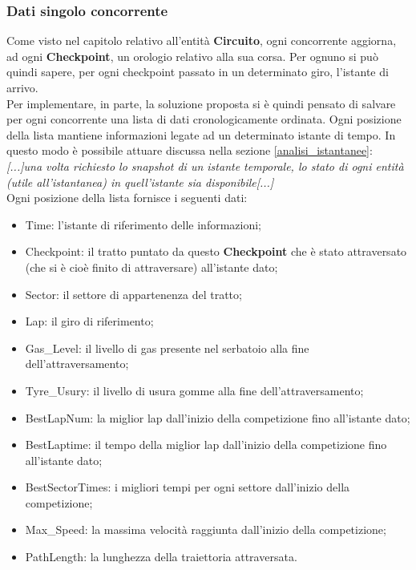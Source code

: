      \subsubsection{Dati singolo concorrente}
     \label{stat_competitor}
     Come visto nel capitolo relativo all'entità \textbf{Circuito}, ogni
concorrente aggiorna, ad ogni 
     \textbf{Checkpoint}, un orologio relativo alla sua corsa. Per ognuno si può
quindi sapere, per ogni checkpoint passato in un determinato giro,
     l'istante di arrivo.\\
     Per implementare, in parte, la soluzione proposta si è quindi pensato di
salvare per ogni concorrente una lista di dati cronologicamente ordinata.
     Ogni posizione della lista mantiene informazioni legate ad un determinato
istante di tempo. In questo modo è possibile attuare discussa nella
     sezione \ref{analisi_istantanee}:\\
     \emph{[...]una volta richiesto lo snapshot di un istante temporale, lo
stato di ogni entità (utile all'istantanea) in 
     quell'istante sia disponibile[...]}\\
     Ogni posizione della lista fornisce i seguenti dati:
     \begin{itemize}
     \item Time: l'istante di riferimento delle informazioni;
     \item Checkpoint: il tratto puntato da questo \textbf{Checkpoint} che è
stato attraversato (che si è cioè finito di attraversare) 
     all'istante dato;
     \item Sector: il settore di appartenenza del tratto;
     \item Lap: il giro di riferimento;
     \item Gas\_Level: il livello di gas presente nel serbatoio alla fine
dell'attraversamento;
     \item Tyre\_Usury: il livello di usura gomme alla fine
dell'attraversamento;
     \item BestLapNum: la miglior lap dall'inizio della competizione fino
all'istante dato;
     \item BestLaptime: il tempo della miglior lap dall'inizio della
competizione fino all'istante dato;
     \item BestSectorTimes: i migliori tempi per ogni settore dall'inizio della
competizione;
     \item Max\_Speed: la massima velocità raggiunta dall'inizio della
competizione;
     \item PathLength: la lunghezza della traiettoria attraversata.
     \end{itemize}

